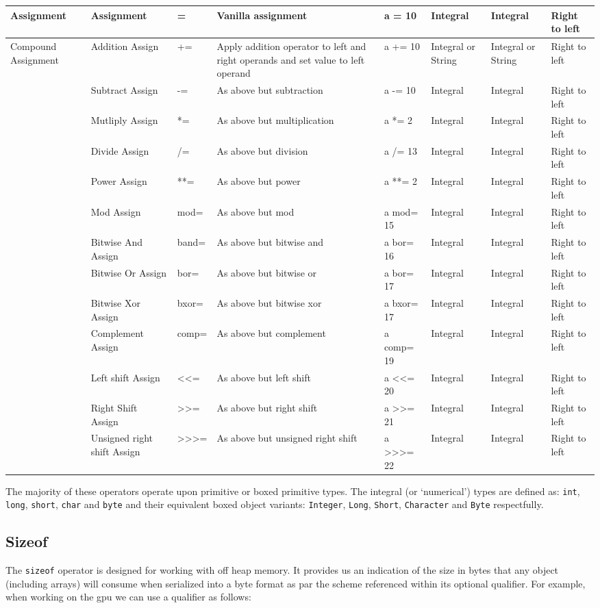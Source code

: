 \documentclass[conc-doc]{subfiles}
\begin{document}
{\begin{longtable}[hbt!]{| l | l | l | l | l | l | l | l |}
Assignment& Assignment& =& Vanilla assignment& a = 10& Integral& Integral& Right to left\\ \hline

Compound Assignment& Addition Assign& +=& Apply addition operator to left and right operands and set value to left operand& a += 10& Integral or String& Integral or String& Right to left\\
& Subtract Assign& -=& As above but subtraction& a -= 10& Integral& Integral& Right to left\\
& Mutliply Assign& *=& As above but multiplication& a *= 2& Integral& Integral& Right to left\\
& Divide Assign& /=& As above but division& a /= 13& Integral& Integral& Right to left\\
& Power Assign& **=& As above but power& a **= 2& Integral& Integral& Right to left\\
& Mod Assign& mod=& As above but mod& a mod= 15& Integral& Integral& Right to left\\
& Bitwise And Assign& band=& As above but bitwise and& a bor= 16& Integral& Integral& Right to left\\
& Bitwise Or Assign& bor=& As above but bitwise or& a bor= 17& Integral& Integral& Right to left\\
& Bitwise Xor Assign& bxor=& As above but bitwise xor& a bxor= 17& Integral& Integral& Right to left\\
& Complement Assign& comp=& As above but complement& a comp= 19& Integral& Integral& Right to left\\
& Left shift Assign& <<=& As above but left shift& a <<= 20& Integral& Integral& Right to left\\
& Right Shift Assign& >>=& As above but right shift& a >>= 21& Integral& Integral& Right to left\\
& Unsigned right shift Assign& >>>=& As above but unsigned right shift& a >>>= 22& Integral& Integral& Right to left\\
\end{longtable}
}

The majority of these operators operate upon primitive or boxed primitive types. The integral (or ‘numerical’) types are defined as: \lstinline{int}, \lstinline{long}, \lstinline{short}, \lstinline{char} and \lstinline{byte} and their equivalent boxed object variants: \lstinline{Integer}, \lstinline{Long}, \lstinline{Short}, \lstinline{Character} and \lstinline{Byte} respectfully.

\subsection{Sizeof}
The \lstinline{sizeof} operator is designed for working with off heap memory. It provides us an indication of the size in bytes that any object (including arrays) will consume when serialized into a byte format as par the scheme referenced within its optional qualifier. For example, when working on the gpu we can use a qualifier as follows:
\end{document}
